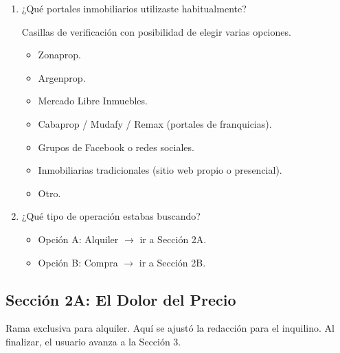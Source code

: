 \begin{enumerate}[label=\textbf{Q\arabic*:}, leftmargin=*]
\item ¿Qué portales inmobiliarios utilizaste habitualmente?

Casillas de verificación con posibilidad de elegir varias opciones.

\begin{itemize}
\item Zonaprop.
\item Argenprop.
\item Mercado Libre Inmuebles.
\item Cabaprop / Mudafy / Remax (portales de franquicias).
\item Grupos de Facebook o redes sociales.
\item Inmobiliarias tradicionales (sitio web propio o presencial).
\item Otro.
\end{itemize}

\item ¿Qué tipo de operación estabas buscando?

\begin{itemize}
\item Opción A: Alquiler $\rightarrow$ ir a Sección 2A.
\item Opción B: Compra $\rightarrow$ ir a Sección 2B.
\end{itemize}
\end{enumerate}

\subsection{Sección 2A: El Dolor del Precio}

Rama exclusiva para alquiler. Aquí se ajustó la redacción para el inquilino. Al finalizar, el usuario avanza a la Sección 3.

